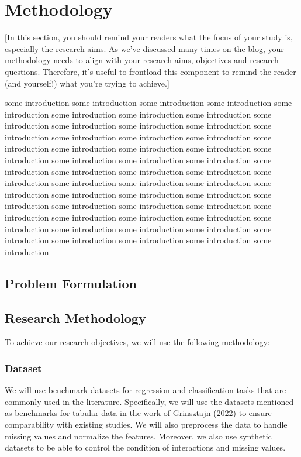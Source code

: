 \chapter{Methodology} \label{chap:meth}

[In this section, you should remind your readers what the focus of your study is, especially the research aims. As we’ve discussed many times on the blog, your methodology needs to align with your research aims, objectives and research questions. Therefore, it’s useful to frontload this component to remind the reader (and yourself!) what you’re trying to achieve.]

some introduction some introduction some introduction some introduction some introduction some introduction some introduction some introduction some introduction some introduction some introduction some introduction some introduction some introduction some introduction some introduction some introduction some introduction some introduction some introduction some introduction some introduction some introduction some introduction some introduction some introduction some introduction some introduction some introduction some introduction some introduction some introduction some introduction some introduction some introduction some introduction some introduction some introduction some introduction some introduction some introduction some introduction some introduction some introduction some introduction some introduction some introduction some introduction some introduction some introduction some introduction some introduction some introduction 
\section{Problem Formulation}


\section{Research Methodology}

To achieve our research objectives, we will use the following methodology:

\subsection{Dataset}
We will use benchmark datasets for regression and classification tasks that are commonly used in the literature. Specifically, we will use the datasets mentioned as benchmarks for tabular data in the work of Grinsztajn (2022) to ensure comparability with existing studies. We will also preprocess the data to handle missing values and normalize the features. Moreover, we also use synthetic datasets to be able to control the condition of interactions and missing values.

